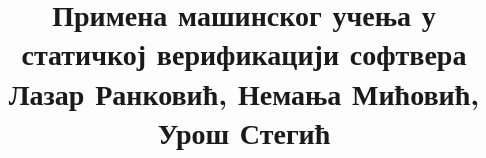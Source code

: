 \documentclass[a4paper]{report}
\newcommand{\odgovor}[1]{\textcolor{blue}{#1}}
\begin{document}
\title{Примена машинског учења у статичкој верификацији софтвера\\ \small{Лазар Ранковић, Немања Мићовић, Урош Стегић}}

\maketitle

\tableofcontents

%
%
%
%
%
%
\end{document}
